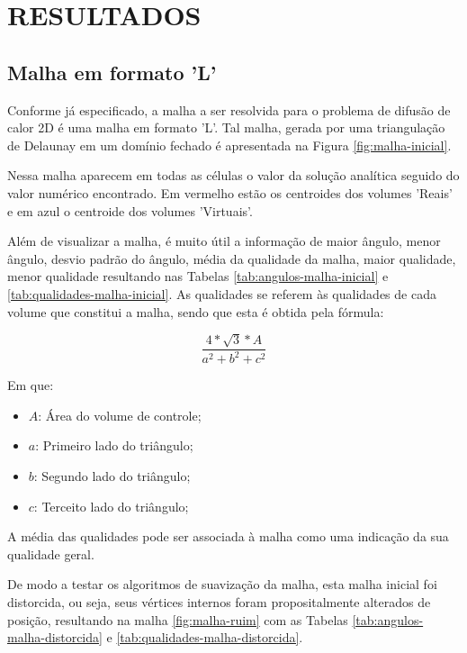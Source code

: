 \chapter[RESULTADOS]{RESULTADOS}

\section{Malha em formato 'L'}
Conforme já especificado, a malha a ser resolvida para o problema de difusão de calor 2D é uma malha em formato 'L'. Tal malha, gerada por uma triangulação de Delaunay em um domínio fechado é apresentada na Figura \ref{fig:malha-inicial}.

Nessa malha aparecem em todas as células o valor da solução analítica seguido do valor numérico encontrado. Em vermelho estão os centroides dos volumes 'Reais' e em azul o centroide dos volumes 'Virtuais'.

Além de visualizar a malha, é muito útil a informação de maior ângulo, menor ângulo, desvio padrão do ângulo, média da qualidade da malha, maior qualidade, menor qualidade resultando nas Tabelas \ref{tab:angulos-malha-inicial} e \ref{tab:qualidades-malha-inicial}. As qualidades se referem às qualidades de cada volume que constitui a malha, sendo que esta é obtida pela fórmula:

\begin{equation}
    \frac{4 * \sqrt{3} * A}{a^2 + b^2 + c^2}
    \label{eq:qualidade}
\end{equation}

Em que:
\begin{itemize}
    \item $A$: Área do volume de controle;
    \item $a$: Primeiro lado do triângulo;
    \item $b$: Segundo lado do triângulo;
    \item $c$: Terceito lado do triângulo;
\end{itemize}

A média das qualidades pode ser associada à malha como uma indicação da sua qualidade geral.

De modo a testar os algoritmos de suavização da malha, esta malha inicial foi distorcida, ou seja, seus vértices internos foram propositalmente alterados de posição, resultando na malha \ref{fig:malha-ruim} com as Tabelas \ref{tab:angulos-malha-distorcida} e \ref{tab:qualidades-malha-distorcida}.

